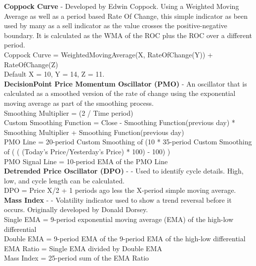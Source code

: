 \documentclass[conference]{IEEEtran}
\begin{document}

\noindent
\textbf{Coppock Curve} - Developed by Edwin Coppock. Using a Weighted Moving Average as well as a period based Rate Of Change, this simple indicator as been used by many as a sell indicator as the value crosses the positive-negative boundary. It is calculated as the WMA of the ROC plus the ROC over a different period.\\

\noindent
Coppock Curve = WeightedMovingAverage(X, RateOfChange(Y)) + RateOfChange(Z)\\
Default X = 10, Y = 14, Z = 11. \\

\noindent
\textbf{DecisionPoint Price Momentum Oscillator (PMO)} - An oscillator that is calculated as a smoothed version of the rate of change using the exponential moving average as part of the smoothing process. \\

\noindent
Smoothing Multiplier = (2 / Time period)\\
Custom Smoothing Function = {Close - Smoothing Function(previous day)} * Smoothing Multiplier + Smoothing Function(previous day) \\
PMO Line = 20-period Custom Smoothing of (10 * 35-period Custom Smoothing of ( ( (Today's Price/Yesterday's Price) * 100) - 100) )\\
PMO Signal Line = 10-period EMA of the PMO Line\\

\noindent
\textbf{Detrended Price Oscillator (DPO)} - \cite{Murphy1999} - Used to identify cycle details. High, low, and cycle length can be calculated.\\

\noindent
DPO = Price {X/2 + 1} periods ago less the X-period simple moving average.\\

\noindent
\textbf{Mass Index} - \cite{Murphy1999} - Volatility indicator used to show a trend reversal before it occurs.  Originally developed by Donald Dorsey. \\

\noindent
Single EMA = 9-period exponential moving average (EMA) of the high-low differential \\
Double EMA = 9-period EMA of the 9-period EMA of the high-low differential \\
EMA Ratio = Single EMA divided by Double EMA \\
Mass Index = 25-period sum of the EMA Ratio \\
\end{document}
